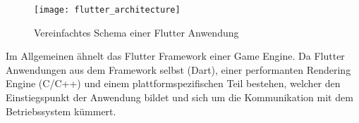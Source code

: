 \begin{figure}[h]
	\texttt{[image: flutter\_architecture]}
	\centering
	\caption{Vereinfachtes Schema einer Flutter Anwendung}
\end{figure}

Im Allgemeinen ähnelt das Flutter Framework einer Game Engine. Da Flutter Anwendungen aus dem Framework selbst (Dart), einer performanten Rendering Engine (C/C++) und einem plattformspezifischen Teil bestehen, welcher den Einstiegspunkt der Anwendung bildet und sich um die Kommunikation mit dem Betriebssystem kümmert.


